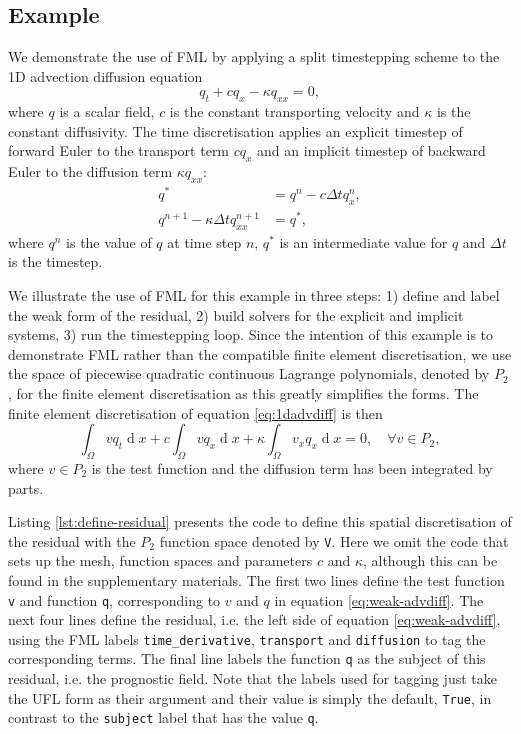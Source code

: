 \documentclass[journal abbreviation, manuscript]{copernicus}
\DeclareMathOperator{\diff}{d}
\begin{document}
\subsection{Example}

We demonstrate the use of FML by applying a split timestepping scheme
to the 1D advection diffusion equation
\begin{equation}\label{eq:1dadvdiff}
  q_t + cq_x - \kappa q_{xx} = 0,
\end{equation}
where $q$ is a scalar field, $c$ is the constant transporting velocity
and $\kappa$ is the constant diffusivity. The time discretisation
applies an explicit timestep of forward Euler to the transport term
$cq_x$ and an implicit timestep of backward Euler to the diffusion
term $\kappa q_{xx}$:
\begin{align}
  q^* &= q^n - c \Delta t q_x^n, \label{eq:explicit-advdiff} \\
  q^{n+1} - \kappa \Delta t q_{xx}^{n+1} &= q^*, \label{eq:implicit-advdiff}
\end{align}
where $q^n$ is the value of $q$ at time step $n$, $q^*$ is an
intermediate value for $q$ and $\Delta t$ is the timestep.

We illustrate the use of FML for this example in three steps: 1)
define and label the weak form of the residual, 2) build solvers for
the explicit and implicit systems, 3) run the timestepping loop. Since
the intention of this example is to demonstrate FML rather than the
compatible finite element discretisation, we use the space of piecewise
quadratic continuous Lagrange polynomials, denoted by $P_2$, for the
finite element discretisation as this greatly simplifies the
forms. The finite element discretisation of equation
\ref{eq:1dadvdiff} is then
\begin{equation}\label{eq:weak-advdiff}
  \int_\Omega vq_t \diff x + c \int_\Omega v q_x \diff x + \kappa \int_\Omega v_x q_x \diff x = 0, \quad \forall v \in P_2,
\end{equation}
where $v\in P_2$ is the test function and the diffusion term has been
integrated by parts.

Listing \ref{lst:define-residual} presents the code to define this
spatial discretisation of the residual with the $P_2$ function space
denoted by \texttt{V}. Here we omit the code that sets up the mesh,
function spaces and parameters $c$ and $\kappa$, although this can be
found in the supplementary materials. The first two lines define the
test function \texttt{v} and function \texttt{q}, corresponding to $v$
and $q$ in equation \ref{eq:weak-advdiff}. The next four lines define
the residual, i.e. the left side of equation \ref{eq:weak-advdiff},
using the FML labels \texttt{time\_derivative}, \texttt{transport} and
\texttt{diffusion} to tag the corresponding terms. The final line
labels the function \texttt{q} as the subject of this residual,
i.e. the prognostic field. Note that the labels used for tagging just
take the UFL form as their argument and their value is simply the
default, \texttt{True}, in contrast to the \texttt{subject} label that
has the value \texttt{q}.
\end{document}

